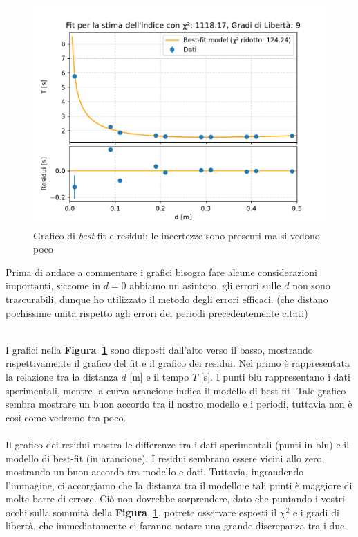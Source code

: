 \documentclass{article}
\begin{document}
\vspace{1.5cm}

\begin{figure}[H]
	\centering
	\includegraphics[scale=0.80]{Fit_e_residui.pdf}
	\caption{Grafico di \emph{best}-fit e residui: le incertezze sono presenti ma si vedono poco
	\label{fig:2}
	}
\end{figure}
\pagebreak
\begin{minipage}{1.0 \textwidth}
\noindent Prima di andare a commentare i grafici bisogra fare alcune considerazioni importanti, siccome in $d=0$ abbiamo un asintoto, gli errori sulle $d$ non sono trascurabili, dunque ho utilizzato il metodo degli errori efficaci. (che distano pochissime unita rispetto agli errori dei periodi precedentemente citati)\\\
\end{minipage}


\begin{minipage}{1.0 \textwidth}
I grafici nella \textbf{Figura~\ref{fig:2}} sono disposti dall'alto verso il basso, mostrando rispettivamente il grafico del fit e il grafico dei residui. Nel primo è rappresentata la relazione tra la distanza \( d \) [m] e il tempo \( T \) [s]. I punti blu rappresentano i dati sperimentali, mentre la curva arancione indica il modello di best-fit. Tale grafico sembra mostrare un buon accordo tra il nostro modello e i periodi, tuttavia non è così come vedremo tra poco.
\\\\
Il grafico dei residui mostra le differenze tra i dati sperimentali (punti in blu) e il modello di best-fit (in arancione). I residui sembrano essere vicini allo zero, mostrando un buon accordo tra modello e dati. Tuttavia, ingrandendo l'immagine, ci accorgiamo che la distanza tra il modello e tali punti è maggiore di molte barre di errore. Ciò non dovrebbe sorprendere, dato che puntando i vostri occhi sulla sommità della \textbf{Figura~\ref{fig:2}}, potrete osservare esposti il \( \chi^2 \) e i gradi di libertà, che immediatamente ci faranno notare una grande discrepanza tra i due.
\end{minipage}
\end{document}
